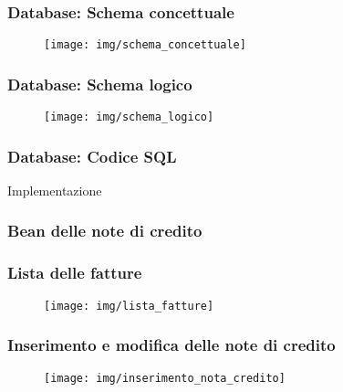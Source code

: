 \documentclass[]{beamer}
\begin{document}
    \begin{frame}
        \frametitle{Database: Schema concettuale}
        \begin{figure}[H]
            \centering
            \texttt{[image: img/schema\_concettuale]}\label{schema:concettuale}
        \end{figure}
    \end{frame}

    \begin{frame}
        \frametitle{Database: Schema logico}
        \begin{figure}[H]
            \centering
            \texttt{[image: img/schema\_logico]}\label{schema:logico}
        \end{figure}
    \end{frame}

    \begin{frame}
        \frametitle{Database: Codice SQL}
        
    \end{frame}

    \begin{frame}
        \begin{center}
            \Huge Implementazione 
        \end{center}
    \end{frame}

    \begin{frame}
        \frametitle{Bean delle note di credito}
        
    \end{frame}

    \begin{frame}
        \frametitle{Lista delle fatture}
        \begin{figure}[H]
            \centering
            \texttt{[image: img/lista\_fatture]}\label{img:lista_fatture}
        \end{figure}
    \end{frame}

    \begin{frame}
        \frametitle{Inserimento e modifica delle note di credito}
        \begin{figure}[H]
            \centering
            \texttt{[image: img/inserimento\_nota\_credito]}\label{fig:insert}
        \end{figure}
    \end{frame}
\end{document}
